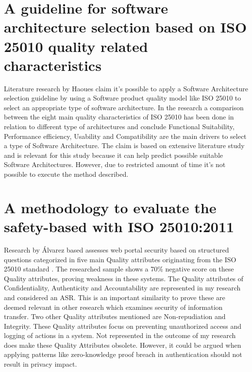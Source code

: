 \section*{A guideline for software architecture selection based on ISO 25010 quality related characteristics}
Literature research by Haoues \etal \cite{Haoues2017AGF} claim it's possible to apply a Software Architecture selection guideline by using a Software product quality model like ISO 25010 \cite{ISO:25010:2011} to select an appropriate type of software architecture. In the research a comparison between the eight main quality characteristics of ISO 25010 has been done in relation to different type of architectures and conclude Functional Suitability, Performance efficiency, Usability and Compatibility are the main drivers to select a type of Software Architecture. The claim is based on extensive literature study and is relevant for this study because it can help predict possible suitable Software Architectures. However, due to restricted amount of time it's not possible to execute the method described. 

\section*{A methodology to evaluate the safety-based with ISO 25010:2011}
Research by {\'A}lvarez \etal \cite{Mexlvarez2021AMT} based assesses web portal security based on structured questions categorized in five main Quality attributes originating from the ISO 25010 standard \cite{ISO:25010:2011}. The researched sample shows a 70\% negative score on these Quality attributes, proving weakness in these systems. The Quality attributes of Confidentiality, Authenticity and Accountability are represented in my research and considered an ASR. This is an important similarity to prove these are deemed relevant in other research which examines security of information transfer. Two other Quality attributes mentioned are Non-repudiation and Integrity. These Quality attributes focus on preventing unauthorized access and logging of actions in a system. Not represented in the outcome of my research does make these Quality Attributes obsolete. However, it could be argued when applying patterns like zero-knowledge proof breach in authentication should not result in privacy impact.